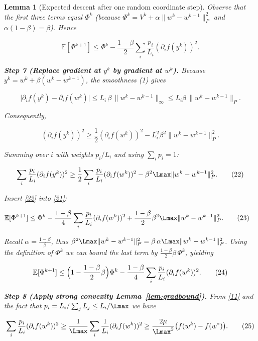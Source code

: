 \documentclass{article}
\newtheorem{lemma}{Lemma}
\newcommand{\E}{\mathbb{E}}
\begin{document}
\begin{lemma}[Expected descent after one random coordinate step]
Observe that the first three terms equal $\Phi^{k}$
(because $\Phi^{k}=V^{k}+\alpha\|w^{k}-w^{k-1}\|_{P}^{2}$
and $\alpha(1-\beta)=\beta$). Hence

\[
\E[\Phi^{k+1}]\le \Phi^{k}
        -\frac{1-\beta}{2}
        \sum_{i}\frac{p_{i}}{L_{i}}
        (\partial_{i}f(y^{k}))^{2}.                         \tag{21}
\]

\medskip
\noindent\textbf{Step 7 (Replace gradient at $y^{k}$ by gradient at $w^{k}$).}
Because $y^{k}=w^{k}+ \beta (w^{k}-w^{k-1})$, the smoothness (1) gives

\[
\bigl|\partial_{i}f(y^{k})-\partial_{i}f(w^{k})\bigr|
\le L_{i}\,\beta\,\|w^{k}-w^{k-1}\|_{\infty}
\le L_{i}\beta\,\|w^{k}-w^{k-1}\|_{P}.
\]

Consequently,

\[
(\partial_{i}f(y^{k}))^{2}
\ge \frac12(\partial_{i}f(w^{k}))^{2}
      -L_{i}^{2}\beta^{2}\|w^{k}-w^{k-1}\|_{P}^{2}.
\]

Summing over $i$ with weights $p_{i}/L_{i}$ and using $\sum_{i}p_{i}=1$:

\[
\sum_{i}\frac{p_{i}}{L_{i}}(\partial_{i}f(y^{k}))^{2}
\ge
\frac12\sum_{i}\frac{p_{i}}{L_{i}}(\partial_{i}f(w^{k}))^{2}
      -\beta^{2}\Lmax\|w^{k}-w^{k-1}\|_{P}^{2}.               \tag{22}
\]

Insert \eqref{22} into \eqref{21}:

\begin{align}
\E[\Phi^{k+1}]
&\le \Phi^{k}
   -\frac{1-\beta}{4}
      \sum_{i}\frac{p_{i}}{L_{i}}(\partial_{i}f(w^{k}))^{2}
   +\frac{1-\beta}{2}\beta^{2}\Lmax\|w^{k}-w^{k-1}\|_{P}^{2}. \tag{23}
\end{align}

Recall $\alpha=\frac{1-\beta}{\beta}$, thus $\beta^{2}\Lmax\|w^{k}-w^{k-1}\|_{P}^{2}
= \beta\,\alpha\Lmax\|w^{k}-w^{k-1}\|_{P}^{2}$.
Using the definition of $\Phi^{k}$ we can bound the last term by
$\frac{1-\beta}{2}\beta\,\Phi^{k}$, yielding

\[
\E[\Phi^{k+1}]
\le \Bigl(1-\frac{1-\beta}{2}\beta\Bigr)\Phi^{k}
   -\frac{1-\beta}{4}
      \sum_{i}\frac{p_{i}}{L_{i}}(\partial_{i}f(w^{k}))^{2}. \tag{24}
\]

\medskip
\noindent\textbf{Step 8 (Apply strong convexity Lemma~\ref{lem:gradbound}).}
From \eqref{11} and the fact that $p_{i}=L_{i}/\sum_{j}L_{j}\le L_{i}/\Lmax$ we have

\[
\sum_{i}\frac{p_{i}}{L_{i}}(\partial_{i}f(w^{k}))^{2}
\ge
\frac{1}{\Lmax}\sum_{i}\frac{1}{L_{i}}(\partial_{i}f(w^{k}))^{2}
\ge \frac{2\mu}{\Lmax^{2}}\bigl(f(w^{k})-f(w^{*})\bigr).       \tag{25}
\]


\end{lemma}
\end{document}
